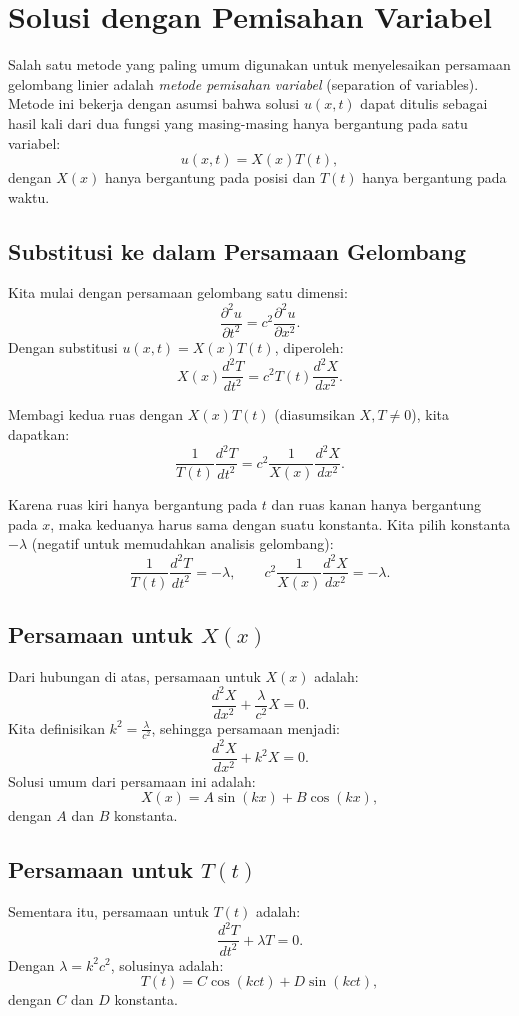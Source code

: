 \documentclass{bukumjh}
\begin{document}
\section{Solusi dengan Pemisahan Variabel}

Salah satu metode yang paling umum digunakan untuk menyelesaikan persamaan gelombang linier adalah \emph{metode pemisahan variabel} (separation of variables). 
Metode ini bekerja dengan asumsi bahwa solusi $u(x,t)$ dapat ditulis sebagai hasil kali dari dua fungsi yang masing-masing hanya bergantung pada satu variabel:
\[
u(x,t) = X(x) T(t),
\]
dengan $X(x)$ hanya bergantung pada posisi dan $T(t)$ hanya bergantung pada waktu.

\subsection*{Substitusi ke dalam Persamaan Gelombang}
Kita mulai dengan persamaan gelombang satu dimensi:
\[
\frac{\partial^2 u}{\partial t^2} = c^2 \frac{\partial^2 u}{\partial x^2}.
\]
Dengan substitusi $u(x,t) = X(x) T(t)$, diperoleh:
\[
X(x) \frac{d^2 T}{dt^2} = c^2 T(t) \frac{d^2 X}{dx^2}.
\]

Membagi kedua ruas dengan $X(x)T(t)$ (diasumsikan $X,T \neq 0$), kita dapatkan:
\[
\frac{1}{T(t)} \frac{d^2 T}{dt^2} = c^2 \frac{1}{X(x)} \frac{d^2 X}{dx^2}.
\]

Karena ruas kiri hanya bergantung pada $t$ dan ruas kanan hanya bergantung pada $x$, maka keduanya harus sama dengan suatu konstanta. 
Kita pilih konstanta $-\lambda$ (negatif untuk memudahkan analisis gelombang):
\[
\frac{1}{T(t)} \frac{d^2 T}{dt^2} = -\lambda, 
\qquad
c^2 \frac{1}{X(x)} \frac{d^2 X}{dx^2} = -\lambda.
\]

\subsection*{Persamaan untuk $X(x)$}
Dari hubungan di atas, persamaan untuk $X(x)$ adalah:
\[
\frac{d^2 X}{dx^2} + \frac{\lambda}{c^2} X = 0.
\]
Kita definisikan $k^2 = \frac{\lambda}{c^2}$, sehingga persamaan menjadi:
\[
\frac{d^2 X}{dx^2} + k^2 X = 0.
\]
Solusi umum dari persamaan ini adalah:
\[
X(x) = A \sin(kx) + B \cos(kx),
\]
dengan $A$ dan $B$ konstanta.

\subsection*{Persamaan untuk $T(t)$}
Sementara itu, persamaan untuk $T(t)$ adalah:
\[
\frac{d^2 T}{dt^2} + \lambda T = 0.
\]
Dengan $\lambda = k^2 c^2$, solusinya adalah:
\[
T(t) = C \cos(kct) + D \sin(kct),
\]
dengan $C$ dan $D$ konstanta.
\end{document}
